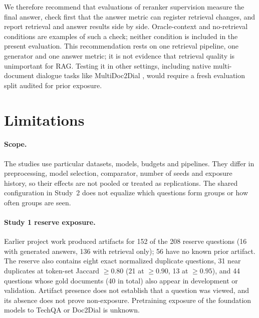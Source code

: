 We therefore recommend that evaluations of reranker supervision measure the final answer, check first that the answer metric can register retrieval changes, and report retrieval and answer results side by side. Oracle-context and no-retrieval conditions are examples of such a check; neither condition is included in the present evaluation. This recommendation rests on one retrieval pipeline, one generator and one answer metric; it is not evidence that retrieval quality is unimportant for RAG. Testing it in other settings, including native multi-document dialogue tasks like MultiDoc2Dial \citep{feng2021multi}, would require a fresh evaluation split audited for prior exposure.

\section{Limitations}\label{sec:limitations}
\paragraph{Scope.} The studies use particular datasets, models, budgets and pipelines. They differ in preprocessing, model selection, comparator, number of seeds and exposure history, so their effects are not pooled or treated as replications. The shared configuration in Study~2 does not equalize which questions form groups or how often groups are seen.

\paragraph{Study 1 reserve exposure.} Earlier project work produced artifacts for 152 of the 208 reserve questions (16 with generated answers, 136 with retrieval only); 56 have no known prior artifact. The reserve also contains eight exact normalized duplicate questions, 31 near duplicates at token-set Jaccard $\ge 0.80$ (21 at $\ge 0.90$, 13 at $\ge 0.95$), and 44 questions whose gold documents (40 in total) also appear in development or validation. Artifact presence does not establish that a question was viewed, and its absence does not prove non-exposure. Pretraining exposure of the foundation models to TechQA or Doc2Dial is unknown.

